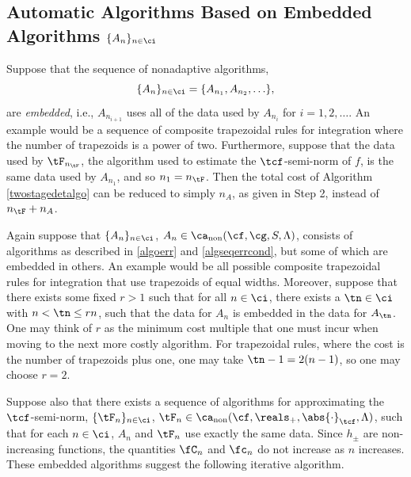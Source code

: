 \documentclass[]{elsarticle}
\DeclareMathOperator{\fix}{non}
\theoremstyle{definition}
\theoremstyle{remark}
\newcommand{\Ftnorm}[1]{\abs{#1}_{\tcf}}
\begin{document}
\subsection{Automatic Algorithms Based on Embedded Algorithms $\{A_n\}_{n \in \ci}$}

Suppose that the sequence of nonadaptive algorithms, 
\[
\{A_n\}_{n \in \ci} = \{A_{n_1}, A_{n_2}, \ldots \}, 
\]
are \emph{embedded}, i.e., $A_{n_{i+1}}$ uses all of the data used by $A_{n_{i}}$ for $i=1, 2, \ldots$.  An example would be a sequence of composite trapezoidal rules for integration where the number of trapezoids is a power of two. Furthermore, suppose that the data used by $\tF_{n_{\tF}}$, the algorithm used to estimate the $\tcf$-semi-norm of $f$, is the same data used by $A_{n_1}$, and so $n_1=n_{\tF}$.  Then the total cost of Algorithm \ref{twostagedetalgo} can be reduced to simply $n_A$, as given in Step 2, instead of $n_{\tF}+n_A$.

Again suppose that $\{A_n\}_{n \in \ci}$, $A_n  \in \ca_{\fix}(\cf,\cg,S,\Lambda)$, consists of algorithms as described in \eqref{algoerr} and \eqref{algseqerrcond}, but some of which are embedded in others.  An example would be all possible composite trapezoidal rules for integration that use trapezoids of equal widths.   Moreover, suppose that there exists some fixed $r > 1$ such that for all $n \in \ci$, there exists a $\tn \in \ci$ with $n < \tn \le rn$, such that the data for $A_n$ is embedded in the data for $A_{\tn}$. One may think of $r$ as the minimum cost multiple that one must incur when moving to the next more costly algorithm. For trapezoidal rules, where the cost is the number of trapezoids plus one, one may take $\tn-1=2(n-1)$, so one may choose $r=2$.

Suppose also that there exists a sequence of algorithms for approximating the $\tcf$-semi-norm, $\{\tF_n\}_{n \in \ci}$, $\tF_n  \in \ca_{\fix}(\cf,\reals_+,\Ftnorm{\cdot},\Lambda)$, such that for each $n \in \ci$, $A_n$ and $\tF_n$ use exactly the same data.
Since $h_{\pm}$ are non-increasing functions, the quantities $\fC_{n}$ and $\fc_n$ do not increase as $n$ increases. These embedded algorithms suggest the following iterative algorithm.
\end{document}
